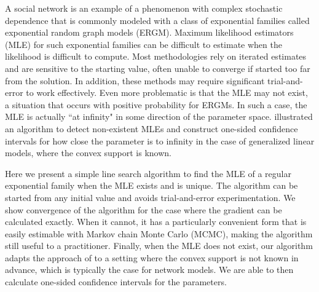 A social network is an example of a phenomenon with complex stochastic dependence 
that is commonly modeled with a class of exponential families called exponential random graph models (ERGM).
Maximum likelihood estimators (MLE) for such  
exponential families
can be difficult to estimate when the likelihood is difficult to compute.
Most methodologies rely on iterated estimates and are sensitive
to the starting value, often unable to converge if started too far from the
solution.  In addition, these methods may require significant trial-and-error to 
work effectively.  
Even more problematic is that the MLE may not exist, 
a situation that occurs with positive probability for ERGMs.
In such a case, the MLE 
is actually ``at infinity" in some direction of the parameter space.  
\citet{Geyer:gdor} illustrated an algorithm to detect non-existent MLEs 
and construct one-sided confidence intervals for how close
the parameter is to infinity in the case of generalized linear 
models, where the convex support is known.  

Here we present a simple line search algorithm to find the MLE of a regular exponential 
family when the MLE exists and is unique.  
The algorithm can be started from any 
initial value and avoids trial-and-error experimentation.  
We show convergence of the algorithm for the case where the gradient can be 
calculated exactly.  When it cannot, it has a particularly convenient form that is 
easily estimable with Markov chain Monte Carlo (MCMC), making the algorithm still useful to a practitioner.  
Finally, when the MLE does not exist, our algorithm adapts the 
approach of \citet{Geyer:gdor} to a setting where the convex support is not
known in advance, which is typically the case for network models.  
We are able to then calculate one-sided confidence intervals
for the parameters.